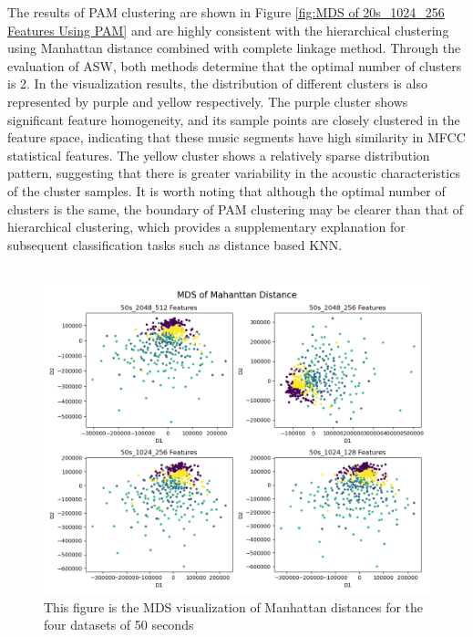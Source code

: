 \noindent The results of PAM clustering are shown in Figure \ref{fig:MDS of 20s_1024_256 Features Using PAM} and are highly consistent with the hierarchical clustering using Manhattan distance combined with complete linkage method. Through the evaluation of ASW, both methods determine that the optimal number of clusters is 2. In the visualization results, the distribution of different clusters is also represented by purple and yellow respectively. The purple cluster shows significant feature homogeneity, and its sample points are closely clustered in the feature space, indicating that these music segments have high similarity in MFCC statistical features. The yellow cluster shows a relatively sparse distribution pattern, suggesting that there is greater variability in the acoustic characteristics of the cluster samples. It is worth noting that although the optimal number of clusters is the same, the boundary of PAM clustering may be clearer than that of hierarchical clustering, which provides a supplementary explanation for subsequent classification tasks such as distance based KNN.\\
\\
\begin{figure}[h!]
	\centering
	\includegraphics[width=0.9\linewidth]{../Statistical_Sciences_template/figure/MDS of Mahanttan Distance 50s.png}
	\caption{This figure is the MDS visualization of Manhattan distances for the four datasets of 50 seconds}
	\label{fig:MDS of Mahanttan Distance 50s}
\end{figure}
